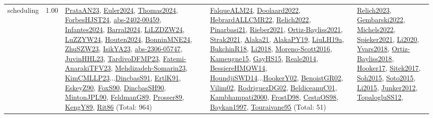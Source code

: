 {\begin{longtable}{p{3cm}r>{\raggedright\arraybackslash}p{6cm}>{\raggedright\arraybackslash}p{6cm}>{\raggedright\arraybackslash}p{8cm}}
\index{scheduling}\index{Scheduling!scheduling}scheduling &  1.00 & \hyperref[detail:PrataAN23]{PrataAN23}, \hyperref[detail:Euler2024]{Euler2024}, \hyperref[detail:Thomas2024]{Thomas2024}, \hyperref[detail:ForbesHJST24]{ForbesHJST24}, \hyperref[detail:abs-2402-00459]{abs-2402-00459}, \hyperref[detail:Infantes2024]{Infantes2024}, \hyperref[detail:Barral2024]{Barral2024}, \hyperref[detail:LiLZDZW24]{LiLZDZW24}, \hyperref[detail:LuZZYW24]{LuZZYW24}, \hyperref[detail:Houten2024]{Houten2024}, \hyperref[detail:BonninMNE24]{BonninMNE24}, \hyperref[detail:ZhuSZW23]{ZhuSZW23}, \hyperref[detail:IsikYA23]{IsikYA23}, \hyperref[detail:abs-2306-05747]{abs-2306-05747}, \hyperref[detail:JuvinHHL23]{JuvinHHL23}, \hyperref[detail:TardivoDFMP23]{TardivoDFMP23}, \hyperref[detail:Fatemi-AnarakiTFV23]{Fatemi-AnarakiTFV23}, \hyperref[detail:Mehdizadeh-Somarin23]{Mehdizadeh-Somarin23}, \hyperref[detail:KimCMLLP23]{KimCMLLP23}...\hyperref[detail:DincbasS91]{DincbasS91}, \hyperref[detail:ErtlK91]{ErtlK91}, \hyperref[detail:EskeyZ90]{EskeyZ90}, \hyperref[detail:FoxS90]{FoxS90}, \hyperref[detail:DincbasSH90]{DincbasSH90}, \hyperref[detail:MintonJPL90]{MintonJPL90}, \hyperref[detail:FeldmanG89]{FeldmanG89}, \hyperref[detail:Prosser89]{Prosser89}, \hyperref[detail:KengY89]{KengY89}, \hyperref[detail:Rit86]{Rit86} (Total: 964) & \hyperref[detail:FalqueALM24]{FalqueALM24}, \hyperref[detail:Doolaard2022]{Doolaard2022}, \hyperref[detail:HebrardALLCMR22]{HebrardALLCMR22}, \hyperref[detail:Relich2022]{Relich2022}, \hyperref[detail:Pinarbasi21]{Pinarbasi21}, \hyperref[detail:Rieber2021]{Rieber2021}, \hyperref[detail:Ortiz-Bayliss2021]{Ortiz-Bayliss2021}, \hyperref[detail:Strak2021]{Strak2021}, \hyperref[detail:Alaka21]{Alaka21}, \hyperref[detail:AlakaPY19]{AlakaPY19}, \hyperref[detail:LiuLH19a]{LiuLH19a}, \hyperref[detail:BukchinR18]{BukchinR18}, \hyperref[detail:Li2018]{Li2018}, \hyperref[detail:Moreno-Scott2016]{Moreno-Scott2016}, \hyperref[detail:Kameugne15]{Kameugne15}, \hyperref[detail:GayHS15]{GayHS15}, \hyperref[detail:Reale2014]{Reale2014}, \hyperref[detail:BessiereHMQW14]{BessiereHMQW14}, \hyperref[detail:HoundjiSWD14]{HoundjiSWD14}...\hyperref[detail:HookerY02]{HookerY02}, \hyperref[detail:BenoistGR02]{BenoistGR02}, \hyperref[detail:Vilim02]{Vilim02}, \hyperref[detail:RodriguezDG02]{RodriguezDG02}, \hyperref[detail:BeldiceanuC01]{BeldiceanuC01}, \hyperref[detail:Kambhampati2000]{Kambhampati2000}, \hyperref[detail:FrostD98]{FrostD98}, \hyperref[detail:CestaOS98]{CestaOS98}, \hyperref[detail:Baykan1997]{Baykan1997}, \hyperref[detail:Touraivane95]{Touraivane95} (Total: 51) & \hyperref[detail:Relich2023]{Relich2023}, \hyperref[detail:Gembarski2022]{Gembarski2022}, \hyperref[detail:Michels2022]{Michels2022}, \hyperref[detail:Spieker2021]{Spieker2021}, \hyperref[detail:Li2020]{Li2020}, \hyperref[detail:Yvars2018]{Yvars2018}, \hyperref[detail:Ortiz-Bayliss2018]{Ortiz-Bayliss2018}, \hyperref[detail:Hooker17]{Hooker17}, \hyperref[detail:Sitek2017]{Sitek2017}, \hyperref[detail:Soh2015]{Soh2015}, \hyperref[detail:Soto2015]{Soto2015}, \hyperref[detail:Li2015]{Li2015}, \hyperref[detail:Junker2012]{Junker2012}, \hyperref[detail:TopalogluSS12]{TopalogluSS12}, 
\end{longtable}}
